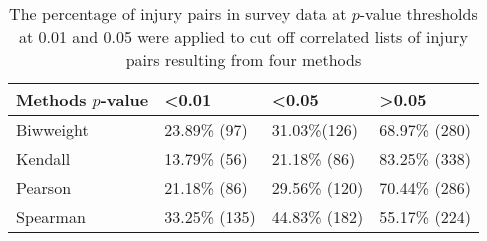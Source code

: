 \begin{table}[!htbp]
\centering
\caption[The percentage of injury pairs in survey data at different $p$-value]{The percentage of injury pairs in survey data at $p$-value thresholds at 0.01 and 0.05 were applied to cut off correlated lists of injury pairs resulting from four methods}
\label{table:injurypairs_percent}
\begin{tabular}{llll}
\hline
Methods $p$-value            & \textless 0.01 & \textless 0.05 & \textgreater 0.05 \\
\hline
Biwweight                  & 23.89\% (97)             & 31.03\%(126)             & 68.97\% (280)               \\
Kendall                    & 13.79\% (56)             & 21.18\% (86)             & 83.25\% (338)               \\
Pearson                    & 21.18\% (86)             & 29.56\% (120)            & 70.44\% (286)               \\
Spearman                   & 33.25\% (135)            & 44.83\% (182)            & 55.17\% (224)              \\
\hline
%
\end{tabular}
\end{table}

